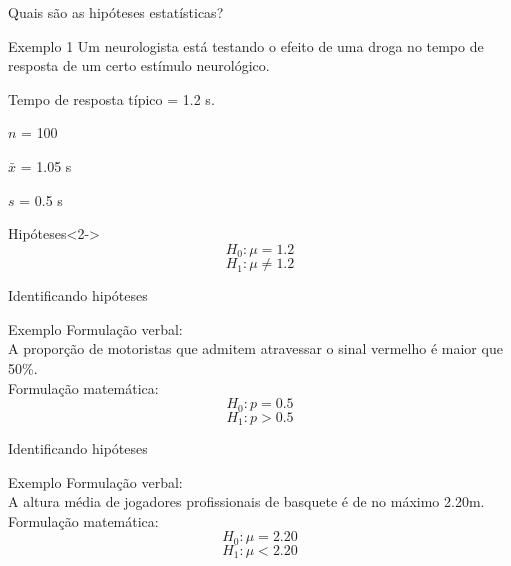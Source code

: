 \documentclass{beamer}
\begin{document}
\begin{frame}{\scriptsize Quais são as hipóteses estatísticas?}
  \begin{exampleblock}{Exemplo 1}
    \scriptsize
    Um neurologista está testando o efeito de uma droga no tempo de
    resposta de um certo estímulo neurológico.

    \smallskip
    Tempo de resposta típico = \alert{1.2 s}.

    \smallskip
    $n$ = \alert{100}

    $\bar{x}$ = \alert{1.05 s}

    $s$ = \alert{0.5 s}
  \end{exampleblock}
  \begin{exampleblock}{Hipóteses}<2->
    \begin{displaymath}
      H_0: \mu=1.2
    \end{displaymath}
    \begin{displaymath}
      H_1: \mu \ne 1.2
    \end{displaymath}
  \end{exampleblock}
\end{frame}

\begin{frame}{\scriptsize Identificando hipóteses}
  \begin{exampleblock}{Exemplo}
    \footnotesize
    Formulação verbal:\\
    A proporção de motoristas que admitem atravessar o sinal vermelho
    é maior que 50\%.\\
    \bigskip
    Formulação matemática:\\
    \begin{displaymath}
      H_0: p=0.5
    \end{displaymath}
    \begin{displaymath}
      H_1: p>0.5
    \end{displaymath}
  \end{exampleblock}
\end{frame}

\begin{frame}{\scriptsize Identificando hipóteses}
  \begin{exampleblock}{Exemplo}
    \footnotesize
    Formulação verbal:\\
    A altura média de jogadores profissionais de basquete é de no
    máximo 2.20m.\\
    \bigskip
    Formulação matemática:\\
    \begin{displaymath}
      H_0: \mu = 2.20
    \end{displaymath}
    \begin{displaymath}
      H_1: \mu < 2.20
    \end{displaymath}
  \end{exampleblock}
\end{frame}
\end{document}
